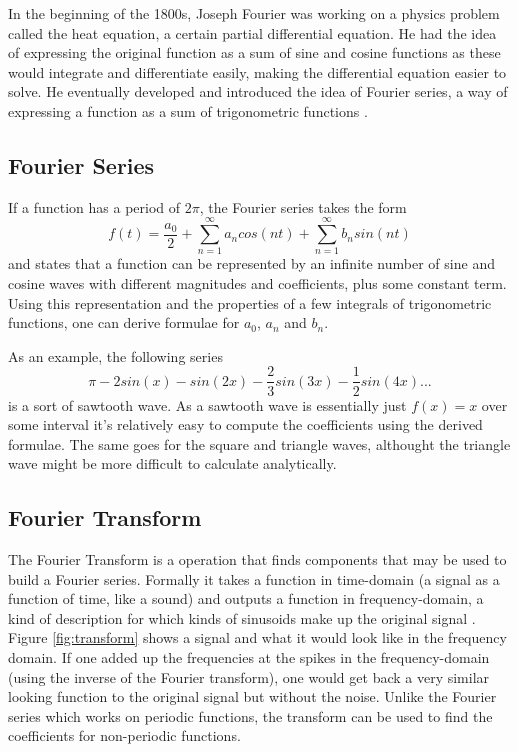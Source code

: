 In the beginning of the 1800s, Joseph Fourier was working on a physics problem called the heat equation, a certain partial differential equation. He had the idea of expressing the original function as a sum of sine and cosine functions as these would integrate and differentiate easily, making the differential equation easier to solve. He eventually developed and introduced the idea of Fourier series, a way of expressing a function as a sum of trigonometric functions \cite{Bounchaleun2019}.
\subsection{Fourier Series} 
If a function has a period of $2\pi$, the Fourier series takes the form $$f(t) = \frac{a_0}{2} + \sum_{n=1}^{\infty}a_ncos(nt)+\sum_{n=1}^{\infty}b_nsin(nt)$$ and states that a function can be represented by an infinite number of sine and cosine waves with different magnitudes and coefficients, plus some constant term. Using this representation and the properties of a few integrals of trigonometric functions, one can derive formulae for $a_0$, $a_n$ and $b_n$.

As an example, the following series $$\pi -2sin(x) -sin(2x) -\frac{2}{3}sin(3x) -\frac{1}{2}sin(4x) ... $$ is a sort of sawtooth wave. As a sawtooth wave is essentially just $f(x) = x$ over some interval it's relatively easy to compute the coefficients using the derived formulae. The same goes for the square and triangle waves, althought the triangle wave might be more difficult to calculate analytically.
 
\subsection{Fourier Transform} 
The Fourier Transform is a operation that finds components that may be used to build a Fourier series. Formally it takes a function in time-domain (a signal as a function of time, like a sound) and outputs a function in frequency-domain, a kind of description for which kinds of sinusoids make up the original signal \cite{SimonXu2015}. Figure \ref{fig:transform} shows a signal and what it would look like in the frequency domain. If one added up the frequencies at the spikes in the frequency-domain (using the inverse of the Fourier transform), one would get back a very similar looking function to the original signal but without the noise. Unlike the Fourier series which works on periodic functions, the transform can be used to find the coefficients for non-periodic functions.

